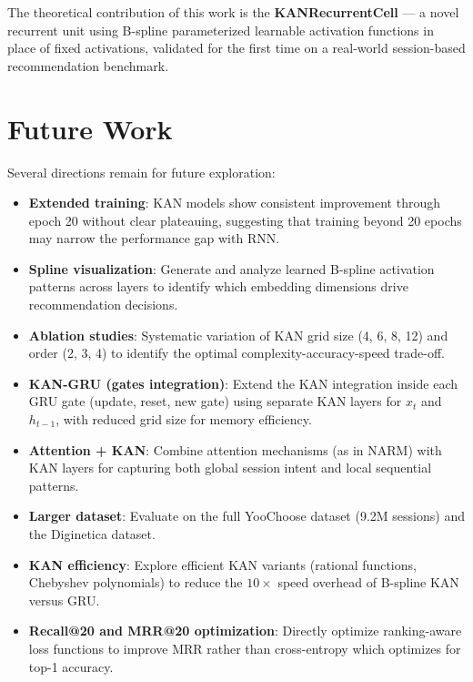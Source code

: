 \documentclass[12pt,a4paper]{report}
\begin{document}
The theoretical contribution of this work is the \textbf{KANRecurrentCell} ---
a novel recurrent unit using B-spline parameterized learnable activation functions
in place of fixed activations, validated for the first time on a real-world
session-based recommendation benchmark.

\section{Future Work}

Several directions remain for future exploration:

\begin{itemize}
    \item \textbf{Extended training}: KAN models show consistent improvement
          through epoch 20 without clear plateauing, suggesting that training
          beyond 20 epochs may narrow the performance gap with RNN.
    \item \textbf{Spline visualization}: Generate and analyze learned B-spline
          activation patterns across layers to identify which embedding dimensions
          drive recommendation decisions.
    \item \textbf{Ablation studies}: Systematic variation of KAN grid size
          (4, 6, 8, 12) and order (2, 3, 4) to identify the optimal
          complexity-accuracy-speed trade-off.
    \item \textbf{KAN-GRU (gates integration)}: Extend the KAN integration inside
          each GRU gate (update, reset, new gate) using separate KAN layers for
          $x_t$ and $h_{t-1}$, with reduced grid size for memory efficiency.
    \item \textbf{Attention + KAN}: Combine attention mechanisms (as in NARM)
          with KAN layers for capturing both global session intent and local
          sequential patterns.
    \item \textbf{Larger dataset}: Evaluate on the full YooChoose dataset
          (9.2M sessions) and the Diginetica dataset.
    \item \textbf{KAN efficiency}: Explore efficient KAN variants (rational
          functions, Chebyshev polynomials) to reduce the $10\times$ speed
          overhead of B-spline KAN versus GRU.
    \item \textbf{Recall@20 and MRR@20 optimization}: Directly optimize
          ranking-aware loss functions to improve MRR rather than cross-entropy
          which optimizes for top-1 accuracy.
\end{itemize}
\end{document}
